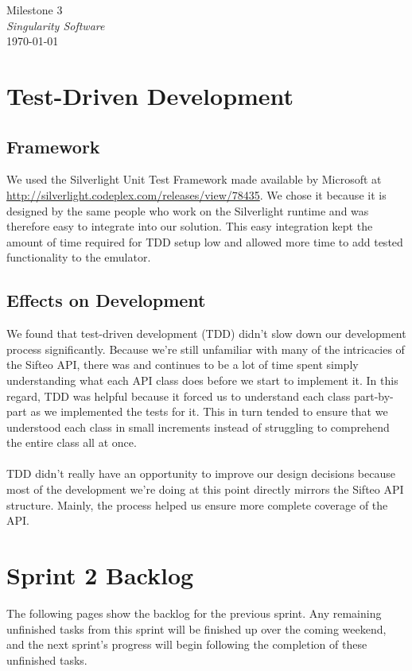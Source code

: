 \documentclass[12pt]{article}
\begin{document}
\begin{center}
	\LARGE{Milestone 3} \\
	\Large{\textit{Singularity Software}} \\
	\vspace{.05in}
	\normalsize{\today} \\
\end{center}

\section*{Test-Driven Development}

\subsection*{Framework}
We used the Silverlight Unit Test Framework made available by Microsoft at \\ \underline{http://silverlight.codeplex.com/releases/view/78435}. We chose it because it is designed by the same people who work on the Silverlight runtime and was therefore easy to integrate into our solution. This easy integration kept the amount of time required for TDD setup low and allowed more time to add tested functionality to the emulator.

\subsection*{Effects on Development}
We found that test-driven development (TDD) didn't slow down our development process significantly. Because we're still unfamiliar with many of the intricacies of the Sifteo API, there was and continues to be a lot of time spent simply understanding what each API class does before we start to implement it. In this regard, TDD was helpful because it forced us to understand each class part-by-part as we implemented the tests for it. This in turn tended to ensure that we understood each class in small increments instead of struggling to comprehend the entire class all at once.
\\\\
TDD didn't really have an opportunity to improve our design decisions because most of the development we're doing at this point directly mirrors the Sifteo API structure. Mainly, the process helped us ensure more complete coverage of the API.

\section*{Sprint 2 Backlog}
The following pages show the backlog for the previous sprint. Any remaining unfinished tasks from this sprint will be finished up over the coming weekend, and the next sprint's progress will begin following the completion of these unfinished tasks.
\end{document}
